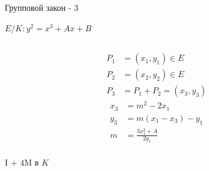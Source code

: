 \documentclass{beamer}
\begin{document}
	\begin{frame}{Групповой закон - 3}%
		\begin{center}
			$E/K: y^2 = x^3 + Ax + B$
		\end{center}
		\begin{columns}
			\begin{column}{0.5\textwidth}
				\begin{equation*}
					\begin{split}
						P_1 &= (x_1, y_1) \in E \\
						P_2 &= (x_2, y_2) \in E \\
						P_3 &= P_1 + P_2 = \left(x_3, y_3\right)
					\end{split}
				\end{equation*}
				\begin{equation*}
					\begin{split}
						x_3 &= m^2 - 2 x_1 \\
						y_3 &= m\left( x_1 - x_3 \right) - y_1\\
						m   &= \frac{3x_1^2 + A}{2 y_1} \\ 
					\end{split}
				\end{equation*}
				\begin{center}
					\begin{tcolorbox}[enhanced,hbox,colback=box-blue-color!15,colframe=box-blue-color,title=Сложность,center title]
						\begin{varwidth}{\textwidth}
							\begin{center}
								I + $4$M в $K$
							\end{center}
						\end{varwidth}
					\end{tcolorbox}	
				\end{center}
				

\end{column}
\end{columns}
\end{frame}
\end{document}
